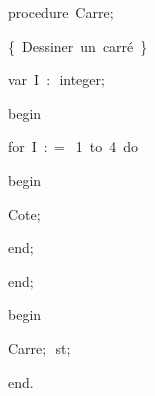 {\pagebreak[3] 
\vspace{\neglskip}\mbox{\blc  \blk\idt  \mcl procedure\idt \ Carre$;$}\par 
\vspace{\neglskip}\mbox{\blc  \blk\blk\idt  \cmt  \{\ Dessiner\ un\ carré\ \}\idt }\par 
\pagebreak[3] 
\vspace{\neglskip}\mbox{\blc  \blk\blk\idt  \mcl var\idt \ I\ $:$\ integer$;$}\par 
\vspace{\neglskip}\mbox{\blc  \blk\idt  \mcl begin\idt }\par 
\pagebreak[3] 
\vspace{\neglskip}\mbox{\blc  \blk\blk\idt  \mcl for\idt \ I\ $:$$=$\ 1\ \mcl to\idt \ 4\ \mcl do\idt }\par 
\vspace{\neglskip}\mbox{\blc  \blk\blk\blk\idt  \mcl begin\idt }\par 
\vspace{\neglskip}\mbox{\blc  \blk\blk\blk\blk\idt  Cote$;$\ }\par 
\vspace{\neglskip}\mbox{\blc  \blk\blk\blk\idt  \mcl end\idt $;$}\par 
\vspace{\neglskip}\mbox{\blc  \blk\idt  \mcl end\idt $;$}\par 
\medskip

\vspace{\neglskip}\mbox{\blc  \idt  \mcl begin\idt }\par 
\vspace{\neglskip}\mbox{\blc  \blk\idt  Carre$;$\ st$;$\ }\par 
\vspace{\neglskip}\mbox{\blc  \idt  \mcl end\idt $.$}\par 

\medskip }


